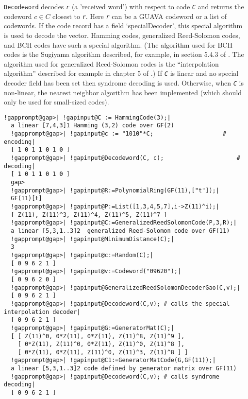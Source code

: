\documentclass[a4paper,11pt]{report}
\begin{document}
{{{ \texttt{Decodeword} decodes \mbox{\texttt{\mdseries\slshape r}} (a 'received word') with respect to code \mbox{\texttt{\mdseries\slshape C}} and returns the codeword $c \in C$ closest to \mbox{\texttt{\mdseries\slshape r}}. Here \mbox{\texttt{\mdseries\slshape r}} can be a \textsf{GUAVA} codeword or a list of codewords. If the code record has a field
`specialDecoder', this special algorithm is used to decode the vector. Hamming
codes, generalized Reed-Solomon codes, and BCH codes have such a special
algorithm. (The algorithm used for BCH codes is the Sugiyama algorithm
described, for example, in section 5.4.3 of \cite{HP03}. The algorithm used for generalized Reed-Solomon codes is the ``interpolation
algorithm'' described for example in chapter 5 of \cite{JH04}.) If \mbox{\texttt{\mdseries\slshape C}} is linear and no special decoder field has been set then syndrome decoding is
used. Otherwise, when \mbox{\texttt{\mdseries\slshape C}} is non-linear, the nearest neighbor algorithm has been implemented (which
should only be used for small-sized codes). }

 
\begin{Verbatim}[commandchars=!@|,fontsize=\small,frame=single,label=Example]
  !gapprompt@gap>| !gapinput@C := HammingCode(3);|
  a linear [7,4,3]1 Hamming (3,2) code over GF(2)
  !gapprompt@gap>| !gapinput@c := "1010"*C;                    # encoding|
  [ 1 0 1 1 0 1 0 ]
  !gapprompt@gap>| !gapinput@Decodeword(C, c);                     # decoding|
  [ 1 0 1 1 0 1 0 ]
  gap>
  !gapprompt@gap>| !gapinput@R:=PolynomialRing(GF(11),["t"]);|
  GF(11)[t]
  !gapprompt@gap>| !gapinput@P:=List([1,3,4,5,7],i->Z(11)^i);|
  [ Z(11), Z(11)^3, Z(11)^4, Z(11)^5, Z(11)^7 ]
  !gapprompt@gap>| !gapinput@C:=GeneralizedReedSolomonCode(P,3,R);|
  a linear [5,3,1..3]2  generalized Reed-Solomon code over GF(11)
  !gapprompt@gap>| !gapinput@MinimumDistance(C);|
  3
  !gapprompt@gap>| !gapinput@c:=Random(C);|
  [ 0 9 6 2 1 ]
  !gapprompt@gap>| !gapinput@v:=Codeword("09620");|
  [ 0 9 6 2 0 ]
  !gapprompt@gap>| !gapinput@GeneralizedReedSolomonDecoderGao(C,v);|
  [ 0 9 6 2 1 ]
  !gapprompt@gap>| !gapinput@Decodeword(C,v); # calls the special interpolation decoder|
  [ 0 9 6 2 1 ]
  !gapprompt@gap>| !gapinput@G:=GeneratorMat(C);|
  [ [ Z(11)^0, 0*Z(11), 0*Z(11), Z(11)^8, Z(11)^9 ],
    [ 0*Z(11), Z(11)^0, 0*Z(11), Z(11)^0, Z(11)^8 ],
    [ 0*Z(11), 0*Z(11), Z(11)^0, Z(11)^3, Z(11)^8 ] ]
  !gapprompt@gap>| !gapinput@C1:=GeneratorMatCode(G,GF(11));|
  a linear [5,3,1..3]2 code defined by generator matrix over GF(11)
  !gapprompt@gap>| !gapinput@Decodeword(C,v); # calls syndrome decoding|
  [ 0 9 6 2 1 ]
\end{Verbatim}
  

}}
\end{document}
